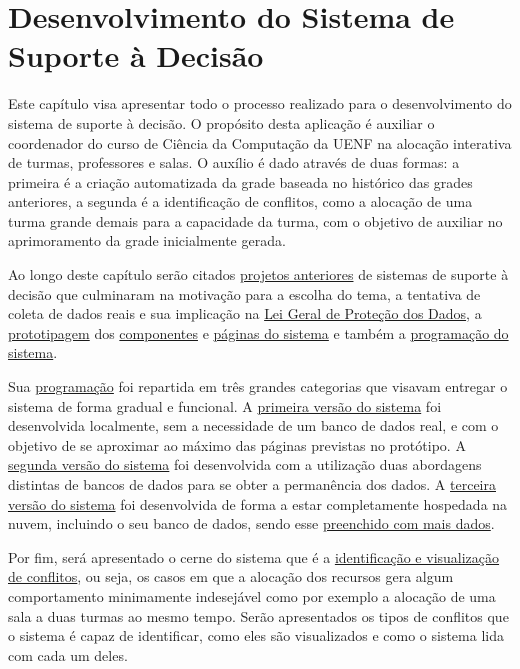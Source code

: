 \chapter{Desenvolvimento do Sistema de Suporte à Decisão} \label{chap:desenvolvimento} %

Este capítulo visa apresentar todo o processo realizado para o desenvolvimento do sistema de suporte à decisão. O propósito desta aplicação é auxiliar o coordenador do curso de Ciência da Computação da UENF na alocação interativa de turmas, professores e salas. O auxílio é dado através de duas formas: a primeira é a criação automatizada da grade baseada no histórico das grades anteriores, a segunda é a identificação de conflitos, como a alocação de uma turma grande demais para a capacidade da turma, com o objetivo de auxiliar no aprimoramento da grade inicialmente gerada.

Ao longo deste capítulo serão citados \hyperref[sec:projetos]{projetos anteriores} de sistemas de suporte à decisão que culminaram na motivação para a escolha do tema, a tentativa de coleta de dados reais e sua implicação na \hyperref[sec:LGPD]{Lei Geral de Proteção dos Dados}, a \hyperref[sec:prototipagem]{prototipagem} dos \hyperref[subsec:componentes]{componentes} e \hyperref[subsec:páginas]{páginas do sistema} e também a \hyperref[sec:programação]{programação do sistema}.

Sua \hyperref[sec:programação]{programação} foi repartida em três grandes categorias que visavam entregar o sistema de forma gradual e funcional. A \hyperref[subsec:MVP1]{primeira versão do sistema} foi desenvolvida localmente, sem a necessidade de um banco de dados real, e com o objetivo de se aproximar ao máximo das páginas previstas no protótipo. A \hyperref[subsec:MVP2]{segunda versão do sistema} foi desenvolvida com a utilização duas abordagens distintas de bancos de dados para se obter a permanência dos dados. A \hyperref[subsec:MVP3]{terceira versão do sistema} foi desenvolvida de forma a estar completamente hospedada na nuvem, incluindo o seu banco de dados, sendo esse \hyperref[par:preenchimento]{preenchido com mais dados}.

Por fim, será apresentado o cerne do sistema que é a \hyperref[sec:conflitos]{identificação e visualização de conflitos}, ou seja, os casos em que a alocação dos recursos gera algum comportamento minimamente indesejável como por exemplo a alocação de uma sala a duas turmas ao mesmo tempo. Serão apresentados os tipos de conflitos que o sistema é capaz de identificar, como eles são visualizados e como o sistema lida com cada um deles.

